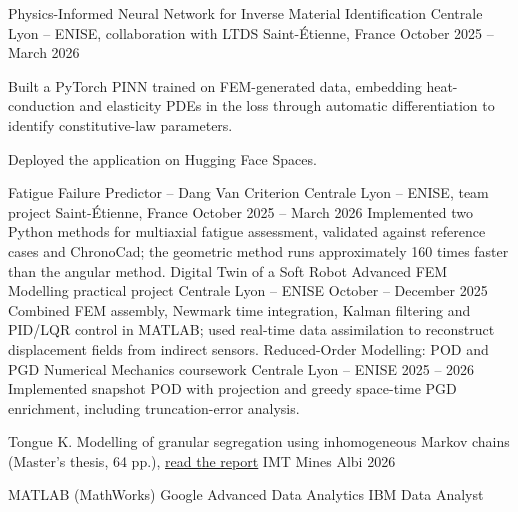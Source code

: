 \documentclass[11pt, a4paper]{awesome-cv}
\begin{document}
\begin{cventries}
  \cventry
    {Physics-Informed Neural Network for Inverse Material Identification}
    {Centrale Lyon -- ENISE, collaboration with LTDS}
    {Saint-Étienne, France}
    {October 2025 -- March 2026}
    {
      \begin{cvitems}
        \item Built a PyTorch PINN trained on FEM-generated data, embedding heat-conduction and elasticity PDEs in the loss through automatic differentiation to identify constitutive-law parameters.
        \item Deployed the application on Hugging Face Spaces.
      \end{cvitems}
    }
  \cventry
    {Fatigue Failure Predictor -- Dang Van Criterion}
    {Centrale Lyon -- ENISE, team project}
    {Saint-Étienne, France}
    {October 2025 -- March 2026}
    {Implemented two Python methods for multiaxial fatigue assessment, validated against reference cases and ChronoCad; the geometric method runs approximately 160 times faster than the angular method.}
  \cventry
    {Digital Twin of a Soft Robot}
    {Advanced FEM Modelling practical project}
    {Centrale Lyon -- ENISE}
    {October -- December 2025}
    {Combined FEM assembly, Newmark time integration, Kalman filtering and PID/LQR control in MATLAB; used real-time data assimilation to reconstruct displacement fields from indirect sensors.}
  \cventry
    {Reduced-Order Modelling: POD and PGD}
    {Numerical Mechanics coursework}
    {Centrale Lyon -- ENISE}
    {2025 -- 2026}
    {Implemented snapshot POD with projection and greedy space-time PGD enrichment, including truncation-error analysis.}
\end{cventries}

\begin{cvhonors}
  \cvhonor
    {Tongue K.}
    {Modelling of granular segregation using inhomogeneous Markov chains (Master's thesis, 64 pp.), \href{https://tiffank1802.github.io/rapports/rapport-stage-dem-mcm.pdf}{\underline{read the report}}}
    {IMT Mines Albi}
    {2026}
\end{cvhonors}

\begin{cvskills}
\end{cvskills}

\begin{cvparagraph}
MATLAB (MathWorks) \quad\textbar\quad Google Advanced Data Analytics \quad\textbar\quad IBM Data Analyst
\end{cvparagraph}
\end{document}

